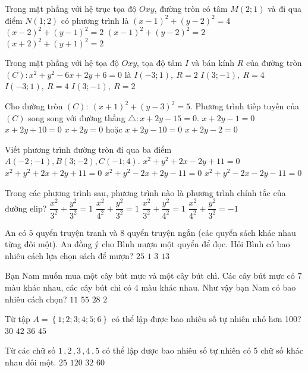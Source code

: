 \begin{ex}
Trong mặt phẳng với hệ trục tọa độ $Oxy$, đường tròn có tâm $M(2;1)$ và đi qua điểm $N(1;2)$ có phương trình là
\choice
{$(x-1)^2+(y-2)^2=4$}
{${{(x-2)}^2}+{{(y-1)}^2}=2$}
{${{(x-1)}^2}+{{(y-2)}^2}=2$}
{${{(x+2)}^2}+{{(y+1)}^2}=2$}
\end{ex}
\begin{ex}
Trong mặt phẳng với hệ tọa độ $Oxy$, tọa độ tâm $I$ và bán kính $R$ của đường tròn $(C)\colon x^2+y^2-6x+2y+6=0$ là
\choice
{$I(-3;1),\ R=2$}
{$I(3;-1),\ R=4$}
{$I(-3;1),\ R=4$}
{$I(3;-1),\ R=2$}
\end{ex}
\begin{ex}
Cho đường tròn $(C)\colon \ {{(x+1)}^2}+{{(y-3)}^2}=5$. Phương trình tiếp tuyến của $(C)$ song song với đường thẳng $\triangle \colon x+2y-15=0$.
\choice
{$x+2y-1=0$}
{$x+2y+10=0$}
{$x+2y=0$ hoặc $x+2y-10=0$}
{$x+2y-2=0$}
\end{ex}
\begin{ex}
Viết phương trình đường tròn đi qua ba điểm $A\left(-2\,;-1\right),B(3;-2),C(-1;4)$.
\choice
{$x^2+y^2+2x-2y+11=0$}
{$x^2+y^2+2x+2y+11=0$}
{$x^2+y^2-2x+2y-11=0$}
{$x^2+y^2-2x-2y-11=0$}
\end{ex}
\begin{ex}
Trong các phương trình sau, phương trình nào là phương trình chính tắc của đường elip?
\choice
{$\dfrac{x^2}{3^2}+\dfrac{y^2}{3^2}=1$}
{$\dfrac{x^2}{4^2}+\dfrac{y^2}{3^2}=1$}
{$\dfrac{x^2}{3^2}+\dfrac{y^2}{4^2}=1$}
{$\dfrac{x^2}{4^2}+\dfrac{y^2}{3^2}=-1$}
\end{ex}
\begin{ex}
An có $5$ quyển truyện tranh và 8 quyển truyện ngắn (các quyển sách khác nhau từng đôi một). An đồng ý cho Bình mượn một quyển để đọc. Hỏi Bình có bao nhiêu cách lựa chọn sách để mượn?
\choice
{$25$}
{$1$}
{$3$}
{$13$}
\end{ex}
\begin{ex}
Bạn Nam muốn mua một cây bút mực và một cây bút chì. Các cây bút mực có $7$ màu khác nhau, các cây bút chì có $4$ màu khác nhau. Như vậy bạn Nam có bao nhiêu cách chọn?
\choice
{$11$}
{$55$}
{$28$}
{$2$}
\end{ex}
\begin{ex}
Từ tập $A=\left\{ 1;2;3;4;5;6 \right\}$ có thể lập được bao nhiêu số tự nhiên nhỏ hơn 100?
\choice
{$30$}
{$42$}
{$36$}
{$45$}
\end{ex}
\begin{ex}
Từ các chữ số $1\,,2\,,3\,,4\,,5$ có thể lập được bao nhiêu số tự nhiên có 5 chữ số khác nhau đôi một.
\choice
{$25$}
{$120$}
{$32$}
{$60$}
\end{ex}
